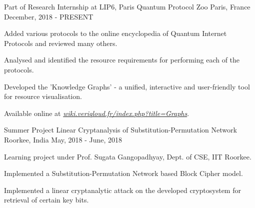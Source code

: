 

\begin{cventries}

  \cventry
    {Part of Research Internship at LIP6, Paris} %
    {Quantum Protocol Zoo} %
    {Paris, France} %
    {December, 2018 - PRESENT} %
    {
      \begin{cvitems} %
        \item {Added various protocols to the online encyclopedia of Quantum Internet Protocols and reviewed many others.}
        \item {Analysed and identified the resource requirements for performing each of the protocols.}
        \item {Developed the 'Knowledge Graphs' - a unified, interactive and user-friendly tool for resource visualisation.}
        \item {Available online at  \emph{\href{https://wiki.veriqloud.fr/index.php?title=Graphs}{wiki.veriqloud.fr/index.php?title=Graphs}}.}
      \end{cvitems}
    }

  \cventry
    {Summer Project} %
    {Linear Cryptanalysis of Substitution-Permutation Network} %
    {Roorkee, India} %
    {May, 2018 - June, 2018} %
    {
      \begin{cvitems} %
        \item {Learning project under Prof. Sugata Gangopadhyay, Dept. of CSE, IIT Roorkee.}
        \item {Implemented a Substitution-Permutation Network based Block Cipher model.}
        \item {Implemented a linear cryptanalytic attack on the developed cryptosystem for retrieval of certain key bits.}
      \end{cvitems}
    }


\end{cventries}
